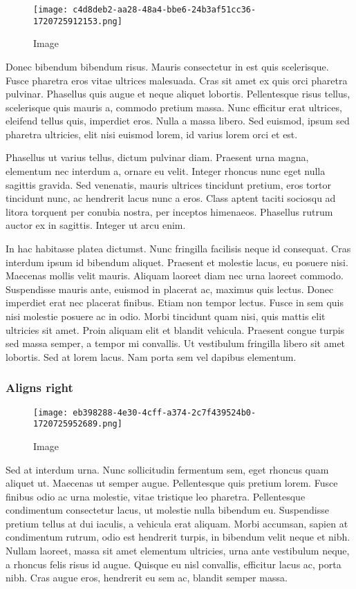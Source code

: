 \documentclass{article}
\begin{document}
\begin{wrapfigure}{l}{0.49375\textwidth}
\centering
\texttt{[image: c4d8deb2-aa28-48a4-bbe6-24b3af51cc36-1720725912153.png]}
\caption{Image}
\end{wrapfigure}

Donec bibendum bibendum risus. Mauris consectetur in est quis scelerisque. Fusce pharetra eros vitae ultrices malesuada. Cras sit amet ex quis orci pharetra pulvinar. Phasellus quis augue et neque aliquet lobortis. Pellentesque risus tellus, scelerisque quis mauris a, commodo pretium massa. Nunc efficitur erat ultrices, eleifend tellus quis, imperdiet eros. Nulla a massa libero. Sed euismod, ipsum sed pharetra ultricies, elit nisi euismod lorem, id varius lorem orci et est.

Phasellus ut varius tellus, dictum pulvinar diam. Praesent urna magna, elementum nec interdum a, ornare eu velit. Integer rhoncus nunc eget nulla sagittis gravida. Sed venenatis, mauris ultrices tincidunt pretium, eros tortor tincidunt nunc, ac hendrerit lacus nunc a eros. Class aptent taciti sociosqu ad litora torquent per conubia nostra, per inceptos himenaeos. Phasellus rutrum auctor ex in sagittis. Integer ut arcu enim.

In hac habitasse platea dictumst. Nunc fringilla facilisis neque id consequat. Cras interdum ipsum id bibendum aliquet. Praesent et molestie lacus, eu posuere nisi. Maecenas mollis velit mauris. Aliquam laoreet diam nec urna laoreet commodo. Suspendisse mauris ante, euismod in placerat ac, maximus quis lectus. Donec imperdiet erat nec placerat finibus. Etiam non tempor lectus. Fusce in sem quis nisi molestie posuere ac in odio. Morbi tincidunt quam nisi, quis mattis elit ultricies sit amet. Proin aliquam elit et blandit vehicula. Praesent congue turpis sed massa semper, a tempor mi convallis. Ut vestibulum fringilla libero sit amet lobortis. Sed at lorem lacus. Nam porta sem vel dapibus elementum.
\subsubsection*{Aligns right}


\begin{wrapfigure}{r}{0.5125\textwidth}
\centering
\texttt{[image: eb398288-4e30-4cff-a374-2c7f439524b0-1720725952689.png]}
\caption{Image}
\end{wrapfigure}

Sed at interdum urna. Nunc sollicitudin fermentum sem, eget rhoncus quam aliquet ut. Maecenas ut semper augue. Pellentesque quis pretium lorem. Fusce finibus odio ac urna molestie, vitae tristique leo pharetra. Pellentesque condimentum consectetur lacus, ut molestie nulla bibendum eu. Suspendisse pretium tellus at dui iaculis, a vehicula erat aliquam. Morbi accumsan, sapien at condimentum rutrum, odio est hendrerit turpis, in bibendum velit neque et nibh. Nullam laoreet, massa sit amet elementum ultricies, urna ante vestibulum neque, a rhoncus felis risus id augue. Quisque eu nisl convallis, efficitur lacus ac, porta nibh. Cras augue eros, hendrerit eu sem ac, blandit semper massa.
\end{document}
